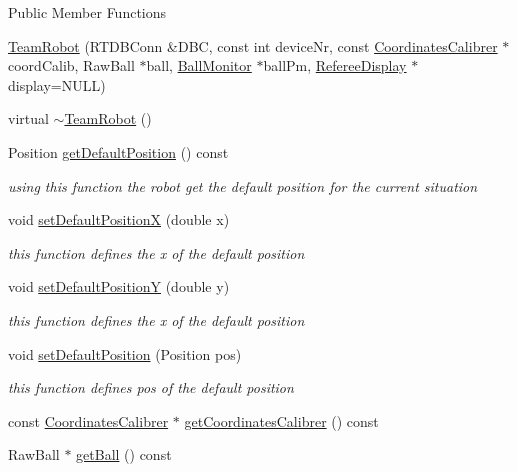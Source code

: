 {Public Member Functions}
\begin{DoxyCompactItemize}
\item 
\hyperlink{classTeamRobot_a4b116f58f0a1568a886d03b0c71df20c}{TeamRobot} (RTDBConn \&DBC, const int deviceNr, const \hyperlink{classCoordinatesCalibrer}{CoordinatesCalibrer} $\ast$coordCalib, RawBall $\ast$ball, \hyperlink{classBallMonitor}{BallMonitor} $\ast$ballPm, \hyperlink{classRefereeDisplay}{RefereeDisplay} $\ast$display=NULL)
\item 
virtual \hyperlink{classTeamRobot_a7be9d5161b7524cbbb6ae486ad4a1b42}{$\sim$TeamRobot} ()
\item 
Position \hyperlink{classTeamRobot_acd11ff6d9651a8deddafa5bd9a30865c}{getDefaultPosition} () const 
\begin{DoxyCompactList}\small\item\em using this function the robot get the default position for the current situation \item\end{DoxyCompactList}\item 
void \hyperlink{classTeamRobot_a527cefdb32f2bc0a4fa770207d4dc934}{setDefaultPositionX} (double x)
\begin{DoxyCompactList}\small\item\em this function defines the x of the default position \item\end{DoxyCompactList}\item 
void \hyperlink{classTeamRobot_afeb86cb88b18030049d525d1d6790e6e}{setDefaultPositionY} (double y)
\begin{DoxyCompactList}\small\item\em this function defines the x of the default position \item\end{DoxyCompactList}\item 
void \hyperlink{classTeamRobot_a322f046e260aedff6f2c8edc5730c9ac}{setDefaultPosition} (Position pos)
\begin{DoxyCompactList}\small\item\em this function defines pos of the default position \item\end{DoxyCompactList}\item 
const \hyperlink{classCoordinatesCalibrer}{CoordinatesCalibrer} $\ast$ \hyperlink{classTeamRobot_a3ef7d4538226085ed4d92b8bd2fce67d}{getCoordinatesCalibrer} () const 
\item 
RawBall $\ast$ \hyperlink{classTeamRobot_a86dbc3bbf6fdcebd4ae41a6f68d92a15}{getBall} () const 

\end{DoxyCompactItemize}
